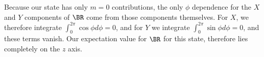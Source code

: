 {Because our state has only \(m=0\) contributions, the only \(\phi\) dependence for the \(X\) and \(Y\) components of \(\BR\) come from those components themselves.  For \(X\), we therefore integrate \(\int_0^{2\pi} \cos\phi d\phi = 0\), and for \(Y\) we integrate \(\int_0^{2\pi} \sin\phi d\phi = 0\), and these terms vanish.  Our expectation value for \(\BR\) for this state, therefore lies completely on the \(z\) axis.
} %

